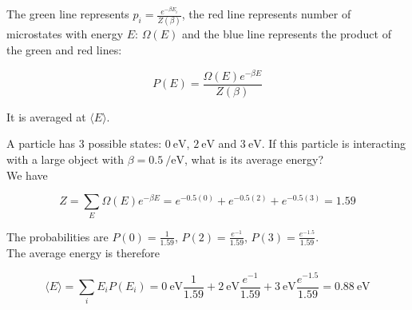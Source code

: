 \documentclass[12pt, a4paper]{article}
\newcounter{exa}
\begin{document}
\begin{texample}
The green line represents $p_i=\frac{e^{-\beta E_i}}{Z(\beta)}$, the red line represents number of microstates with energy $E$: $\Omega(E)$ and the blue line represents the product of the green and red lines:

$$P(E)=\frac{\Omega(E)e^{-\beta E}}{Z(\beta)}$$

It is averaged at $\langle E \rangle$.
\end{texample}

\begin{texample}
A particle has $3$ possible states: $\SI{0}{\electronvolt}$, $\SI{2}{\electronvolt}$ and $\SI{3}{\electronvolt}$. If this particle is interacting with a large object with $\beta=\SI{0.5}{\per\electronvolt}$, what is its average energy? \\

We have

$$Z=\sum_E \Omega(E)e^{-\beta E}=e^{-0.5 (0)}+e^{-0.5 (2)}+e^{-0.5 (3)}=1.59$$

The probabilities are $P(0)=\frac{1}{1.59}$, $P(2)=\frac{e^{-1}}{1.59}$, $P(3)=\frac{e^{-1.5}}{1.59}$. \\

The average energy is therefore

$$\langle E \rangle = \sum_i E_i P(E_i) = \SI{0}{\electronvolt}\frac{1}{1.59}+\SI{2}{\electronvolt}\frac{e^{-1}}{1.59}+\SI{3}{\electronvolt}\frac{e^{-1.5}}{1.59}=\SI{0.88}{\electronvolt}$$
\end{texample}
\end{document}

